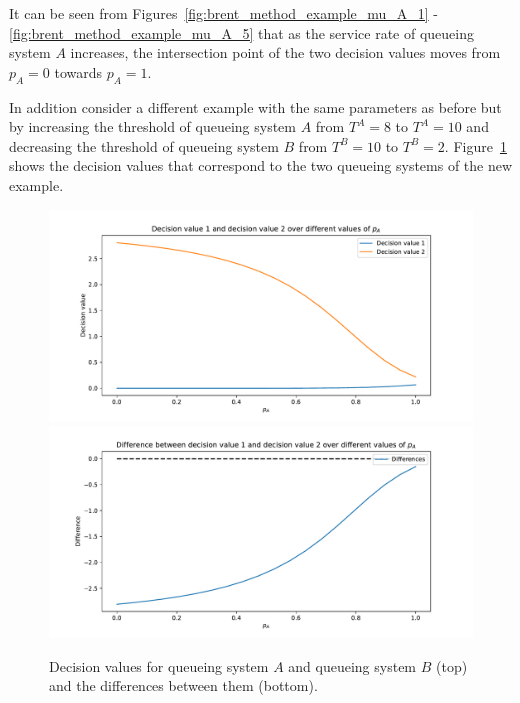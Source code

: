 It can be seen from Figures~\ref{fig:brent_method_example_mu_A_1} -
\ref{fig:brent_method_example_mu_A_5} that as the service rate of queueing
system \(A\) increases, the intersection point of the two decision values moves
from \(p_A=0\) towards \(p_A=1\).

In addition consider a different example with the same parameters as before
but by increasing the threshold of queueing system \(A\) from \(T^A = 8\) to
\(T^A = 10\) and decreasing the threshold of queueing system \(B\) from
\(T^B = 10\) to \(T^B = 2\).
Figure~\ref{fig:brent_method_special_case} shows the decision values that
correspond to the two queueing systems of the new example.

\begin{figure}[H]
    \centering
    \includegraphics[width=\textwidth]{chapters/04_game_theoretic_model/Bin/brents_method/brent_method_special_case.pdf}
    \includegraphics[width=\textwidth]{chapters/04_game_theoretic_model/Bin/brents_method/brent_method_special_case_diffs.pdf}
    \caption{Decision values for queueing system \(A\) and queueing system \(B\)
    (top) and the differences between them (bottom).}
    \label{fig:brent_method_special_case}
\end{figure}

